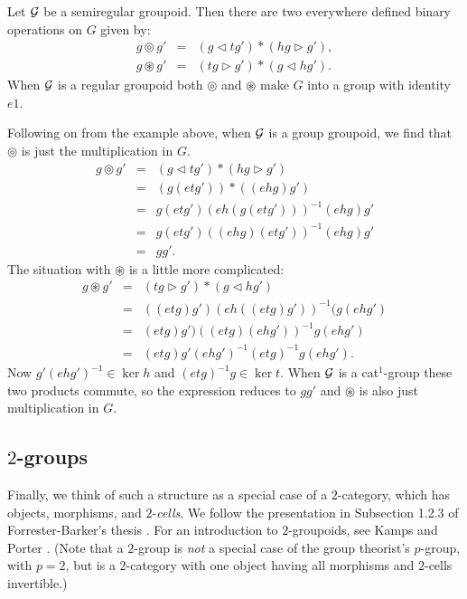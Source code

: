\begin{prop} 
Let $\mathcal{G}$ be a semiregular groupoid. 
Then there are two everywhere defined binary operations on $G$ given by: 
\begin{eqnarray*}
g \circledcirc g' &=& (g \lhd tg') * (hg \rhd g'), \\ 
g \circledast g' &=& (tg \rhd g') * (g \lhd hg'). 
\end{eqnarray*} 
When $\mathcal{G}$ is a regular groupoid both $\circledcirc$ and $\circledast$ 
make $G$ into a group with identity $e1$. 
\end{prop} 

Following on from the example above, when $\mathcal{G}$ is a group groupoid, 
we find that $\circledcirc$ is just the multiplication in $G$. 
\begin{eqnarray*}
g \circledcirc g' &=& (g \lhd tg') * (hg \rhd g') \\
              &=& (g(etg'))*((ehg)g') \\ 
              &=& g(etg')(eh(g(etg')))^{-1}(ehg)g' \\ 
              &=& g(etg')((ehg)(etg'))^{-1}(ehg)g' \\ 
              &=& gg'. 
\end{eqnarray*} 
\noindent
The situation with $\circledast$ is a little more complicated: 
\begin{eqnarray*}
g \circledast g' &=& (tg \rhd g') * (g \lhd hg') \\ 
                 &=& ((etg)g')(eh((etg)g'))^{-1}(g(ehg') \\ 
                 &=& (etg)g')((etg)(ehg'))^{-1}g(ehg') \\ 
                 &=& (etg)g'(ehg')^{-1}(etg)^{-1}g(ehg'). 
\end{eqnarray*} 
Now $g'(ehg')^{-1} \in \ker h$ and $(etg)^{-1}g \in \ker t$. 
When $\mathcal{G}$ is a cat$^1$-group these two products commute, 
so the expression reduces to $gg'$ and $\circledast$ is also 
just multiplication in $G$.


\newpage
\subsection{$2$-groups} \label{subs:twogps}

Finally, we think of such a structure as a special case of a 
   
$2$-category, which has objects, morphisms, and $2$-\emph{cells}.
We follow the presentation in Subsection 1.2.3 of 
Forrester-Barker's thesis \cite{f-b-thesis}. 
For an introduction to $2$-groupoids, 
see Kamps and Porter \cite{kamps:port}.
(Note that a $2$-group is \emph{not} a special case of the group theorist's 
$p$-group, with $p=2$, but is a $2$-category with one object having all 
morphisms and $2$-cells invertible.)

